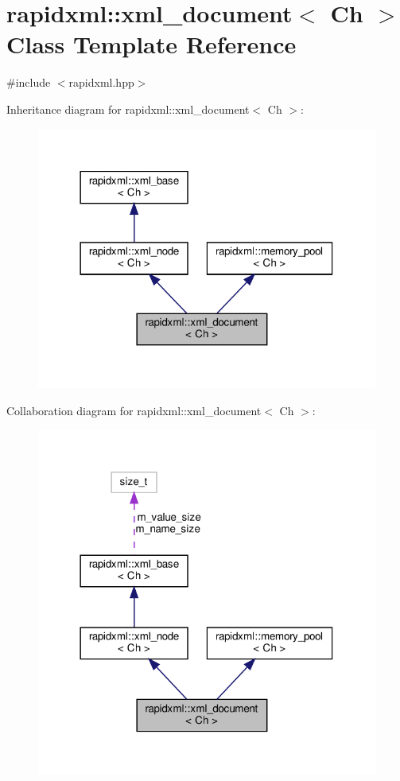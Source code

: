 \hypertarget{classrapidxml_1_1xml__document}{}\section{rapidxml\+:\+:xml\+\_\+document$<$ Ch $>$ Class Template Reference}
\label{classrapidxml_1_1xml__document}


{\ttfamily \#include $<$rapidxml.\+hpp$>$}



Inheritance diagram for rapidxml\+:\+:xml\+\_\+document$<$ Ch $>$\+:
\nopagebreak
\begin{figure}[H]
\begin{center}
\leavevmode
\includegraphics[width=318pt]{classrapidxml_1_1xml__document__inherit__graph}
\end{center}
\end{figure}


Collaboration diagram for rapidxml\+:\+:xml\+\_\+document$<$ Ch $>$\+:
\nopagebreak
\begin{figure}[H]
\begin{center}
\leavevmode
\includegraphics[width=318pt]{classrapidxml_1_1xml__document__coll__graph}
\end{center}
\end{figure}
